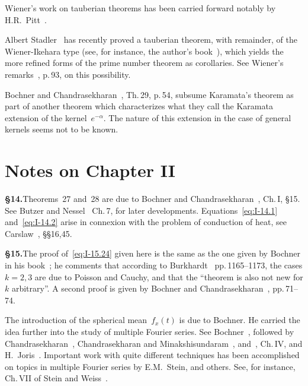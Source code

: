 \noindent Wiener's work on tauberian theorems has been carried forward notably by H.R.~Pitt~\cite{pitt1958}.

\noindent Albert Stadler~\cite{stadler1986} has recently proved a tauberian theorem, with remainder, of the Wiener-Ikehara type (see, for instance, the author's book~\cite{chandrasekharan1968}), which yields the more refined forms of the prime number theorem as corollaries. See Wiener's remarks~\cite{wiener1930}, p.\,93, on this possibility.

\noindent Bochner and Chandrasekharan~\cite{bochnerchandrasekharan1949}, Th.\,29, p.\,54, subsume Karamata's theorem as part of another theorem which characterizes what they call the Karamata extension of the kernel~$e^{-\alpha}$. The nature of this extension in the case of general kernels seems not to be known.

\section*{Notes on Chapter II}

\noindent\textbf{§14.}\quad Theorems~27 and~28 are due to Bochner and Chandrasekharan~\cite{bochnerchandrasekharan1949}, Ch.\,I, §15. See Butzer and Nessel~\cite{butzernessel1971} Ch.\,7, for later developments. Equations~\eqref{eq:I-14.1} and~\eqref{eq:I-14.2} arise in connexion with the problem of conduction of heat, see Carslaw~\cite{carslaw1921}, §§16,45.

\noindent\textbf{§15.}\quad The proof of~\eqref{eq:I-15.24} given here is the same as the one given by Bochner in his book~\cite{bochner1932}; he comments that according to Burkhardt~\cite{burkhardt1904} pp.\,1165--1173, the cases $k=2,3$ are due to Poisson and Cauchy, and that the ``theorem is also not new for $k$ arbitrary''. A second proof is given by Bochner and Chandrasekharan~\cite{bochnerchandrasekharan1949}, pp.\,71--74.

\noindent The introduction of the spherical mean~$f_{x}(t)$ is due to Bochner. He carried the idea further into the study of multiple Fourier series. See Bochner~\cite{bochner1936b}, followed by Chandrasekharan~\cite{chandrasekharan1948}, Chandrasekharan and Minakshisundaram~\cite{chandrasekharanminakshisundaram1947}, and~\cite{chandrasekharanminakshisundaram1952}, Ch.\,IV, and H.~Joris~\cite{joris1968}. Important work with quite different techniques has been accomplished on topics in multiple Fourier series by E.M.~Stein, and others. See, for instance, Ch.\,VII of Stein and Weiss~\cite{steinweiss1971}.

